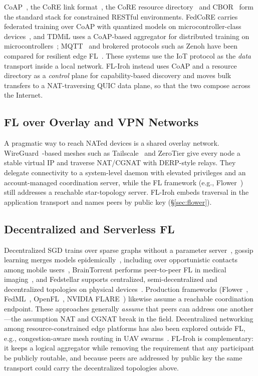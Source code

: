 \documentclass[a4paper,fleqn]{cas-dc}
\begin{document}
CoAP~\cite{rfc7252}, the CoRE link format~\cite{rfc6690}, the CoRE resource directory~\cite{rfc9176} and CBOR~\cite{rfc8949} form the standard stack for constrained RESTful environments. FedCoRE carries federated training over CoAP with quantized models on microcontroller-class devices~\cite{djamaa2025}, and TDMiL uses a CoAP-based aggregator for distributed training on microcontrollers~\cite{gulati2024}; MQTT~\cite{mqtt2019} and brokered protocols such as Zenoh have been compared for resilient edge FL~\cite{almeida2025}. These systems use the IoT protocol as the \emph{data} transport inside a local network. FL-Iroh instead uses CoAP and a resource directory as a \emph{control} plane for capability-based discovery and moves bulk transfers to a NAT-traversing QUIC data plane, so that the two compose across the Internet.

\subsection{FL over Overlay and VPN Networks}

A pragmatic way to reach NATed devices is a shared overlay network. WireGuard~\cite{wireguard2017}-based meshes such as Tailscale~\cite{tailscale2023} and ZeroTier give every node a stable virtual IP and traverse NAT/CGNAT with DERP-style relays. They delegate connectivity to a system-level daemon with elevated privileges and an account-managed coordination server, while the FL framework (e.g., Flower~\cite{flower2022}) still addresses a reachable star-topology server. FL-Iroh embeds traversal in the application transport and names peers by public key (\S\ref{sec:flower}).

\subsection{Decentralized and Serverless FL}

Decentralized SGD trains over sparse graphs without a parameter server~\cite{lian2017}, gossip learning merges models epidemically~\cite{hegedus2019}, including over opportunistic contacts among mobile users~\cite{rizzo2026}, BrainTorrent performs peer-to-peer FL in medical imaging~\cite{roy2019braintorrent}, and Fedstellar supports centralized, semi-decentralized and decentralized topologies on physical devices~\cite{martinezbeltran2024}. Production frameworks (Flower~\cite{flower2022}, FedML~\cite{fedml2020}, OpenFL~\cite{openfl2022}, NVIDIA FLARE~\cite{flare2022}) likewise assume a reachable coordination endpoint. These approaches generally \emph{assume} that peers can address one another---the assumption NAT and CGNAT break in the field. Decentralized networking among resource-constrained edge platforms has also been explored outside FL, e.g., congestion-aware mesh routing in UAV swarms~\cite{bakirci2023}. FL-Iroh is complementary: it keeps a logical aggregator while removing the requirement that any participant be publicly routable, and because peers are addressed by public key the same transport could carry the decentralized topologies above.
\end{document}
